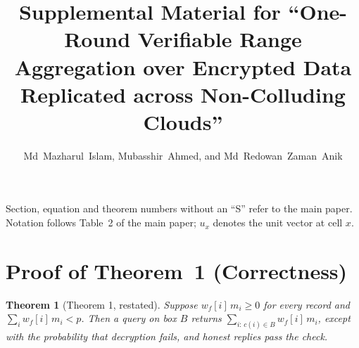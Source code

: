 \documentclass[10pt,journal,compsoc]{IEEEtran}
\newtheorem*{theorem*}{Theorem}
\begin{document}
\title{Supplemental Material for ``One-Round Verifiable Range Aggregation over
Encrypted Data Replicated across Non-Colluding Clouds''}
\author{Md~Mazharul~Islam, Mubasshir~Ahmed, and Md~Redowan~Zaman~Anik}
\maketitle

\noindent Section, equation and theorem numbers without an ``S'' refer to the
main paper. Notation follows Table~2 of the main paper; $u_x$ denotes the unit
vector at cell $x$.

\section{Proof of Theorem~1 (Correctness)}

\begin{theorem*}[Theorem 1, restated]
Suppose $w_f[i]\,m_i\ge0$ for every record and $\sum_iw_f[i]\,m_i<p$. Then a
query on box $B$ returns $\sum_{i:\,c(i)\in B}w_f[i]\,m_i$, except with the
probability that decryption fails, and honest replies pass the check.
\end{theorem*}
\end{document}
